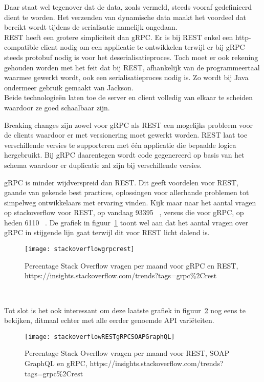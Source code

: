 Daar staat wel tegenover dat de data, zoals vermeld, steeds vooraf gedefinieerd dient te worden.
Het verzenden van dynamische data maakt het voordeel dat bereikt wordt tijdens de serialisatie namelijk ongedaan.\\

REST heeft een grotere simpliciteit dan gRPC. Er is bij REST enkel een http-compatible client nodig om een applicatie te ontwikkelen terwijl
er bij gRPC steeds protobuf nodig is voor het deserialisatieproces. Toch moet er ook rekening gehouden worden met het feit dat bij REST,
afhankelijk van de programmeertaal waarmee gewerkt wordt, ook een serialisatieproces nodig is. Zo wordt bij Java ondermeer gebruik gemaakt van Jackson.\newline
~\autocite{jackson}\\

Beide technologie\"en laten toe de server en client volledig van elkaar te scheiden waardoor ze goed schaalbaar zijn.

Breaking changes zijn zowel voor gRPC als REST een mogelijks probleem voor de clients waardoor er met versionering moet gewerkt worden.
REST laat toe verschillende versies te supporteren met \'e\'en applicatie die bepaalde logica hergebruikt. Bij gRPC daarentegen wordt code gegenereerd op basis van
het schema waardoor er duplicatie zal zijn bij verschillende versies.\newline
~\autocite{grpcversion}

gRPC is minder wijdverspreid dan REST. Dit geeft voordelen voor REST, gaande van gekende best practices, oplossingen voor allerhande problemen
tot simpelweg ontwikkelaars met ervaring vinden. Kijk maar naar het aantal vragen op stackoverflow voor REST, op vandaag 93395 ~\parencite{stackrest},
versus die voor gRPC, op heden 6110 ~\parencite{stackgrpc}. De grafiek in figuur~\ref{fig:stackoverflowgrpcrest} toont wel aan dat het
aantal vragen over gRPC in stijgende lijn gaat terwijl dit voor REST licht dalend is.
\begin{figure}[ht]
    \centering
    \texttt{[image: stackoverflowgrpcrest]}
    \caption{Percentage Stack Overflow vragen per maand voor gRPC en REST,\newline
    https://insights.stackoverflow.com/trends?tags=grpc\%2Crest}
    \label{fig:stackoverflowgrpcrest}
\end{figure}\\
\nocite{stackoverflowRESTgRPC}

Tot slot is het ook interessant om deze laatste grafiek in figuur~\ref{fig:stackoverflowRESTgRPCSOAPGraphQL} nog eens te bekijken, ditmaal echter met alle eerder genoemde API vari\"eteiten.

\begin{figure}[ht]
    \centering
    \texttt{[image: stackoverflowRESTgRPCSOAPGraphQL]}
    \caption{Percentage Stack Overflow vragen per maand voor REST, SOAP GraphQL en gRPC,\newline
    https://insights.stackoverflow.com/trends?tags=grpc\%2Crest}
    \label{fig:stackoverflowRESTgRPCSOAPGraphQL}
\end{figure}
\nocite{stackoverflowRESTgRPCSOAPGraphQL}

